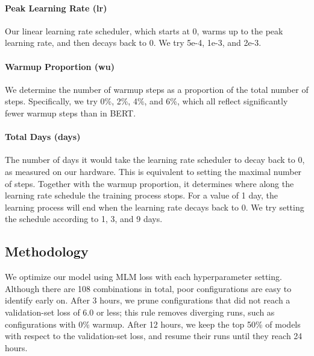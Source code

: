 \paragraph{Peak Learning Rate (lr)}
Our linear learning rate scheduler, which starts at 0, warms up to the peak learning rate, and then decays back to 0. We try 5e-4, 1e-3, and 2e-3.

\paragraph{Warmup Proportion (wu)}
We determine the number of warmup steps as a proportion of the total number of steps. Specifically, we try 0\%, 2\%, 4\%, and 6\%, which all reflect significantly fewer warmup steps than in BERT.


\paragraph{Total Days (days)}
The number of days it would take the learning rate scheduler to decay back to 0, as measured on our hardware. This is equivalent to setting the maximal number of steps.
Together with the warmup proportion, it determines where along the learning rate schedule the training process stops.
For a value of 1 day, the learning process will end when the learning rate decays back to 0.
We try setting the schedule according to 1, 3, and 9 days.


\subsection{Methodology}

We optimize our model using MLM loss with each hyperparameter setting.
Although there are 108 combinations in total, poor configurations are easy to identify early on.
After 3 hours, we prune configurations that did not reach a validation-set loss of 6.0 or less; this rule removes diverging runs, such as configurations with 0\% warmup.
After 12 hours, we keep the top 50\% of models with respect to the validation-set loss, and resume their runs until they reach 24 hours.


